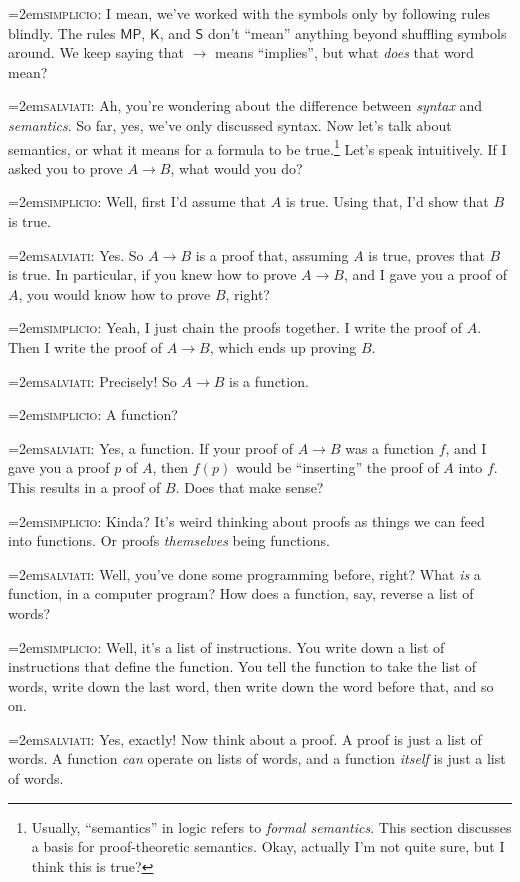 \documentclass[11pt,paper=letter]{scrartcl}
\newcommand{\sf}{\mathsf}
\newcommand{\simp}{\vspace{0.5em}\noindent\hangindent=2em\textsc{simplicio:} }
\newcommand{\salv}{\vspace{0.5em}\noindent\hangindent=2em\textsc{salviati:} }
\begin{document}
\simp I mean, we've worked with the symbols only by following rules blindly. The rules $\sf{MP}$, $\sf{K}$, and $\sf{S}$ don't ``mean'' anything beyond shuffling symbols around. We keep saying that $\to$ means ``implies'', but what \emph{does} that word mean?

\salv Ah, you're wondering about the difference between \emph{syntax} and \emph{semantics}. So far, yes, we've only discussed syntax. Now let's talk about semantics, or what it means for a formula to be true.\footnote{Usually, ``semantics'' in logic refers to \emph{formal semantics}. This section discusses a basis for proof-theoretic semantics. Okay, actually I'm not quite sure, but I think this is true?} Let's speak intuitively. If I asked you to prove $A \to B$, what would you do?

\simp Well, first I'd assume that $A$ is true. Using that, I'd show that $B$ is true.

\salv Yes. So $A \to B$ is a proof that, assuming $A$ is true, proves that $B$ is true. In particular, if you knew how to prove $A \to B$, and I gave you a proof of $A$, you would know how to prove $B$, right?

\simp Yeah, I just chain the proofs together. I write the proof of $A$. Then I write the proof of $A \to B$, which ends up proving $B$.

\salv Precisely! So $A \to B$ is a function.

\simp A function?

\salv Yes, a function. If your proof of $A \to B$ was a function $f$, and I gave you a proof $p$ of $A$, then $f(p)$ would be ``inserting'' the proof of $A$ into $f$. This results in a proof of $B$. Does that make sense?

\simp Kinda? It's weird thinking about proofs as things we can feed into functions. Or proofs \emph{themselves} being functions.

\salv Well, you've done some programming before, right? What \emph{is} a function, in a computer program? How does a function, say, reverse a list of words?

\simp Well, it's a list of instructions. You write down a list of instructions that define the function. You tell the function to take the list of words, write down the last word, then write down the word before that, and so on.

\salv Yes, exactly! Now think about a proof. A proof is just a list of words. A function \emph{can} operate on lists of words, and a function \emph{itself} is just a list of words.
\end{document}
